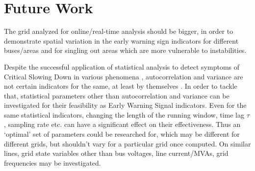 \section[Future Work]{Future Work}
\label{sec:future}

The grid analyzed for online/real-time analysis should be bigger, in order to demonstrate spatial variation in the early warning sign indicators for different buses/areas and for singling out areas which are more vulnerable to instabilities.

Despite the successful application of statistical analysis to detect symptoms of Critical Slowing Down in various phenomena \cite{schefferEarlyWarningSignalsForCriticalTransitions}, autocorrelation and variance are not certain indicators for the same, at least by themselves \cite{csdNotDetectedByAutocorrAndVariance01}.
In order to tackle that, statistical parameters other than autocorrelation and variance can be investigated for their feasibility as Early Warning Signal indicators. Even for the same statistical indicators, changing the length of the running window, time lag $\tau$, sampling rate etc. can have a significant effect on their effectiveness. Thus an `optimal' set of parameters could be researched for, which may be different for different grids, but shouldn't vary for a particular grid once computed.
On similar lines, grid state variables other than bus voltages, line current/MVAs, grid frequencies may be investigated.